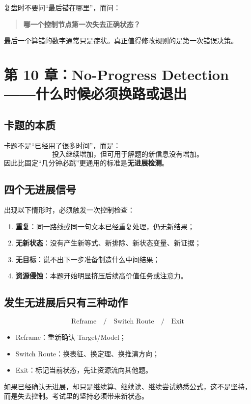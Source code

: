 \documentclass[11pt,a4paper]{ctexart}
\newcommand{\kw}[1]{\textbf{#1}}
\begin{document}
\begin{exam}
复盘时不要问“最后错在哪里”，而问：
\begin{quote}
\kw{哪一个控制节点第一次失去正确状态？}
\end{quote}
最后一个算错的数字通常只是症状。真正值得修改规则的是第一次错误决策。
\end{exam}

\section{第 10 章：No-Progress Detection——什么时候必须换路或退出}

\subsection{卡题的本质}
卡题不是“已经用了很多时间”，而是：
\[
\boxed{
\text{投入继续增加，但可用于解题的新信息没有增加。}
}
\]
因此比固定“几分钟必跳”更通用的标准是\kw{无进展检测}。

\subsection{四个无进展信号}
出现以下情形时，必须触发一次控制检查：
\begin{enumerate}
  \item \kw{重复}：同一路线或同一句文本已经重复处理，仍无新结果；
  \item \kw{无新状态}：没有产生新等式、新排除、新状态变量、新证据；
  \item \kw{无目标}：说不出下一步准备制造什么中间结果；
  \item \kw{资源侵蚀}：本题开始明显挤压后续高价值任务或注意力。
\end{enumerate}

\subsection{发生无进展后只有三种动作}
\[
\boxed{
\text{Reframe}
\quad/\quad
\text{Switch Route}
\quad/\quad
\text{Exit}
}
\]
\begin{itemize}
  \item Reframe：重新确认 Target/Model；
  \item Switch Route：换表征、换定理、换推演方向；
  \item Exit：标记当前状态，先让资源流向其他题。
\end{itemize}

\begin{warn}[禁止“随机继续”]
如果已经确认无进展，却只是继续算、继续读、继续尝试熟悉公式，这不是坚持，而是失去控制。考试里的坚持必须带来新状态。
\end{warn}
\end{document}
